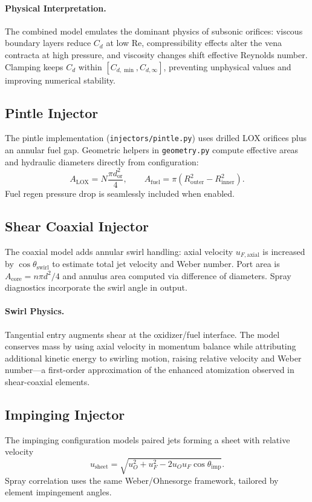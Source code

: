 \documentclass[12pt]{article}
\begin{document}
\paragraph{Physical Interpretation.}  The combined model emulates the dominant physics of subsonic orifices: viscous boundary layers reduce $C_d$ at low Re, compressibility effects alter the vena contracta at high pressure, and viscosity changes shift effective Reynolds number.  Clamping keeps $C_d$ within $[C_{d,\min}, C_{d,\infty}]$, preventing unphysical values and improving numerical stability.

\subsection{Pintle Injector}
The pintle implementation (\verb|injectors/pintle.py|) uses drilled LOX orifices plus an annular fuel gap.  Geometric helpers in \verb|geometry.py| compute effective areas and hydraulic diameters directly from configuration:
\[
A_{\text{LOX}} = N \frac{\pi d_{\text{or}}^2}{4}, \qquad
A_{\text{fuel}} = \pi(R_{\text{outer}}^2 - R_{\text{inner}}^2).
\]
Fuel regen pressure drop is seamlessly included when enabled.

\subsection{Shear Coaxial Injector}
The coaxial model adds annular swirl handling: axial velocity $u_{F,\text{axial}}$ is increased by $\cos\theta_{\text{swirl}}$ to estimate total jet velocity and Weber number.  Port area is $A_{\text{core}} = n\pi d^2 / 4$ and annulus area computed via difference of diameters.  Spray diagnostics incorporate the swirl angle in output.

\paragraph{Swirl Physics.}  Tangential entry augments shear at the oxidizer/fuel interface.  The model conserves mass by using axial velocity in momentum balance while attributing additional kinetic energy to swirling motion, raising relative velocity and Weber number---a first-order approximation of the enhanced atomization observed in shear-coaxial elements.

\subsection{Impinging Injector}
The impinging configuration models paired jets forming a sheet with relative velocity
\[
u_{\text{sheet}} = \sqrt{u_O^2 + u_F^2 - 2 u_O u_F \cos \theta_{\text{imp}}}.
\]
Spray correlation uses the same Weber/Ohnesorge framework, tailored by element impingement angles.
\end{document}
